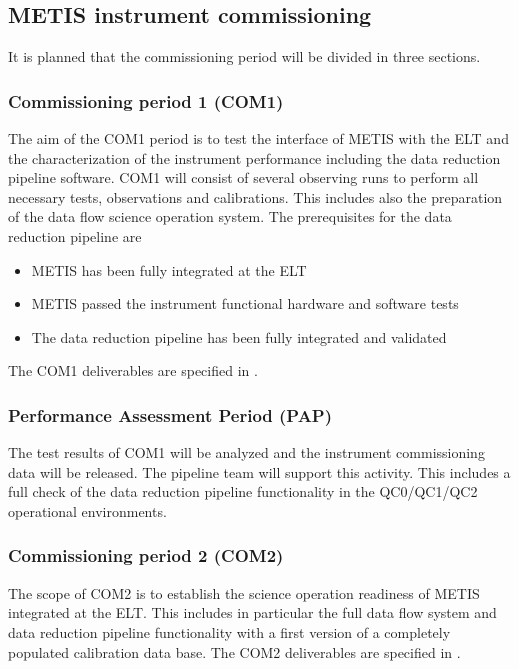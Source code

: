 \subsection{METIS instrument commissioning}
\label{ssec:com}

It is planned that the commissioning period will be divided in three sections.

\subsubsection{Commissioning period 1 (COM1)}
\label{ssec:com1}

The aim of the COM1 period is to test the interface of METIS with the ELT and the characterization of the instrument performance including the data reduction pipeline software. COM1 will consist of several observing runs to perform all necessary tests, observations and calibrations. This includes also the preparation of the data flow science operation system. The prerequisites for the data reduction pipeline are
\begin{itemize}
    \item METIS has been fully integrated at the ELT
    \item METIS passed the instrument functional hardware and software tests
    \item The data reduction pipeline  has been fully integrated and validated
\end{itemize}
The COM1 deliverables are specified in \cite{1618}.

\subsubsection{Performance Assessment Period (PAP)}
\label{ssec:pap}

The test results of COM1 will be analyzed and the instrument commissioning data will be released. The pipeline team will support this activity. This includes a full check of the data reduction pipeline functionality in the QC0/QC1/QC2 operational environments.

\subsubsection{Commissioning period 2 (COM2)}
\label{ssec:com2}

The scope of COM2 is to establish the science operation readiness of METIS integrated at the ELT. This includes in particular the full data flow system and data reduction pipeline functionality with a first version of a completely populated calibration data base. The COM2 deliverables are specified in \cite{1618}.


